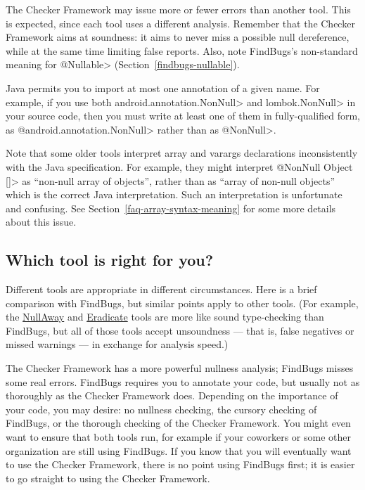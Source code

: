 The Checker Framework may issue more or fewer errors than another tool.
This is expected, since each tool uses a different analysis.  Remember that
the Checker Framework aims at soundness:  it aims to never miss a possible
null dereference, while at the same time limiting false reports.  Also,
note FindBugs's non-standard meaning for \<@Nullable>
(Section~\ref{findbugs-nullable}).

Java permits you to import at most one annotation of a given name.  For
example, if you use both \<android.annotation.NonNull> and
\<lombok.NonNull> in your source code, then you must write at least one of
them in fully-qualified form, as \<@android.annotation.NonNull> rather than
as \<@NonNull>.

Note that some older tools interpret array and varargs declarations
inconsistently with the Java specification.  For example, they might
interpret \<@NonNull Object []> as ``non-null array of objects'', rather
than as ``array of non-null objects'' which is the correct Java
interpretation.  Such an interpretation is unfortunate and confusing.  See
Section~\ref{faq-array-syntax-meaning} for some more details about this
issue.


\subsection{Which tool is right for you?\label{choosing-nullness-tool}}

Different tools are appropriate in different circumstances.  Here is a
brief comparison with FindBugs, but similar points apply to other tools.
(For example, the \href{https://github.com/uber/NullAway}{NullAway} and
\href{http://fbinfer.com/docs/eradicate.html}{Eradicate} tools are more
like sound type-checking than FindBugs, but all of those tools accept
unsoundness --- that is, false negatives or missed warnings --- in exchange
for analysis speed.)

The Checker Framework has a more powerful nullness analysis; FindBugs misses
some real
errors.  FindBugs requires you to annotate your code, but usually not as
thoroughly as the Checker Framework does.  Depending on the importance of
your code, you may desire:  no nullness checking, the cursory checking of
FindBugs, or the thorough checking of the Checker Framework.  You might
even want to ensure that both tools run, for example if your coworkers or
some other organization are still using FindBugs.  If you know that you
will eventually want to use the Checker Framework, there is no point using
FindBugs first; it is easier to go straight to using the Checker Framework.

